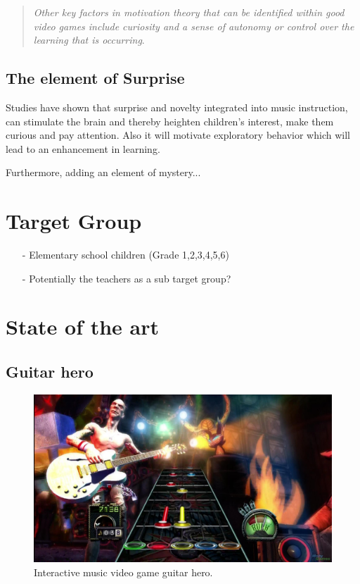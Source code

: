 \begin{quote}
	\textit{Other key factors in motivation theory that can be identified within good video games include curiosity and a sense of autonomy or control over the learning that is occurring}\cite[p.~92]{interactiveMusicVideoGames}.\\
\end{quote}
\subsection{The element of Surprise}
Studies have shown that surprise and novelty integrated into music instruction, can stimulate the brain and thereby heighten children's interest, make them curious and pay attention\cite{bagpipesSurprise}. Also it will motivate exploratory behavior which will lead to an enhancement in learning.


Furthermore, adding an element of mystery...

\section{Target Group}

\begin{itemize}
	\item[-] Elementary school children (Grade 1,2,3,4,5,6)
	\item[-] Potentially the teachers as a sub target group?
\end{itemize}





\section{State of the art}\label{sec:sota}
	
	\subsection{Guitar hero}\label{sec:guitarHero}
		\begin{figure}[H]
			\centering
			\includegraphics[width=0.7\linewidth]{figure/Analysis/guitarhero}
			\caption{Interactive music video game guitar hero.}
			\label{fig:guitarHero}
		\end{figure}
